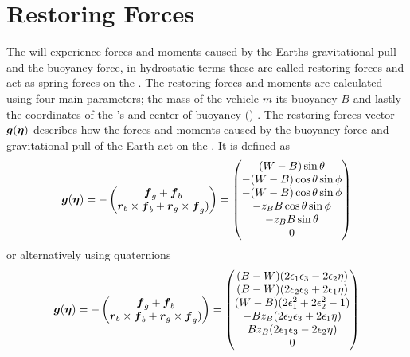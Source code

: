 \section{Restoring Forces}
The \abbrROV will experience forces and moments caused by the Earths gravitational pull and the buoyancy force, in hydrostatic terms these are called restoring forces and act as spring forces on the \abbrROV \citep{fossen2011}. The restoring forces and moments are calculated using four main parameters; the mass of the vehicle $m$ its buoyancy $B$ and lastly the coordinates of the \abbrROV's \abbrCG and center of buoyancy (\abbrCB) \citep{fossen2011}. The restoring forces vector $\boldsymbol{g}(\boldsymbol{\eta})$ describes how the forces and moments caused by the buoyancy force and gravitational pull of the Earth act on the \abbrROV. It is defined as
\begin{equation} \label{eq:restoring_forces}
    \boldsymbol{g}(\boldsymbol{\eta}) = -
     \begin{pmatrix}
    \boldsymbol{f}_g + \boldsymbol{f}_b \\
    \boldsymbol{r}_b \times \boldsymbol{f}_b + \boldsymbol{r}_g \times \boldsymbol{f}_g) 
     \end{pmatrix} 
     =
    \begin{pmatrix}
        (W - B) \sin \theta\\
    -(W - B) \cos \theta \sin \phi\\
    -(W - B) \cos \theta \sin \phi\\
    -z_B B \cos \theta \sin \phi\\
    -z_B B \sin \theta\\
    0\\
    \end{pmatrix}
\end{equation}
or alternatively using quaternions 
\begin{equation}\label{eq:restoring_forces_quat}
    \boldsymbol{g}(\boldsymbol{\eta}) = -
    \begin{pmatrix}
    \boldsymbol{f}_g + \boldsymbol{f}_b \\
    \boldsymbol{r}_b \times \boldsymbol{f}_b + \boldsymbol{r}_g \times \boldsymbol{f}_g) 
     \end{pmatrix} = 
    \begin{pmatrix}
	(B - W) (2 \epsilon_1 \epsilon_3 - 2 \epsilon_2 \eta) 	\\
    (B - W) (2 \epsilon_2 \epsilon_3 + 2 \epsilon_1 \eta) 	\\
 	(W - B)(2 \epsilon_1^2 + 2\epsilon_2^2 - 1)				\\
 	-B z_B (2 \epsilon_2 \epsilon_3 + 2 \epsilon_1 \eta)	\\
  	B z_B (2 \epsilon_1 \epsilon_3 - 2 \epsilon_2 \eta)		\\
    0
    \end{pmatrix}
\end{equation}
